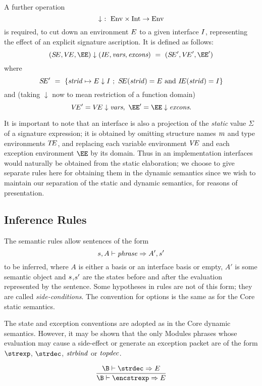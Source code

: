 A further operation
\[ \downarrow\ :\ {\rm Env}\times{\rm Int}\to{\rm Env}\]
is required, to cut down an environment $E$ to a given interface $I$,
representing the effect of an explicit signature ascription.  It is defined
as follows:
\[ (\SE,\VE,\EE)\downarrow(\IE,\vars,\exns)\ =\ (\SE',\VE',\EE') \]
where
\[ S\!E'\ =\ \{{\it strid}\mapsto E\downarrow I\ ;\
          S\!E({\it strid})=E\ {\rm and}\ \mbox{$I\!E$}({\it strid})=I\} \]
and (taking $\downarrow$ now to mean restriction of a function domain)
\[\VE'=\VE\downarrow\vars,\ \EE'=\EE\downarrow\exns.\]

It is important to note that an interface is also a projection of the
{\sl static} value $\Sigma$ of a signature expression; 
it is obtained by omitting structure names $m$ and type environments
$\mbox{$T\!E$}$, and replacing each variable environment $\mbox{$V\!E$}$ and each 
exception environment $\EE$ by its domain.
Thus in an implementation interfaces would naturally be obtained from the
static elaboration; we choose to give separate rules here for obtaining them
in the dynamic semantics since we wish to maintain our separation of the
static and dynamic semantics, for reasons of presentation.

\subsection{Inference Rules}
The semantic rules allow sentences  of the form
\[ s,A\vdash{\it phrase}\Rightarrow A',s' \]
to be inferred, where $A$ is either a basis or an interface basis or empty,
$A'$ is some semantic
object and $s$,$s'$ are the states before and after the evaluation
represented by the sentence.  Some hypotheses in rules are not of this form;
they are called {\sl side-conditions}.  The convention for options is
the same as for the Core static semantics.  

The state and exception conventions are adopted as in the Core dynamic
semantics.  However, it may be shown that the only Modules phrases whose 
evaluation
may cause a side-effect or generate an exception packet are of the form
$\strexp$, $\strdec$, ${\it strbind}$ or ${\it topdec}$.

%
%
\begin{equation}	%
\frac{\B\ts\strdec\ra\E}
     {\B\ts\encstrexp\ra\E}\index{60.1}
\end{equation}


